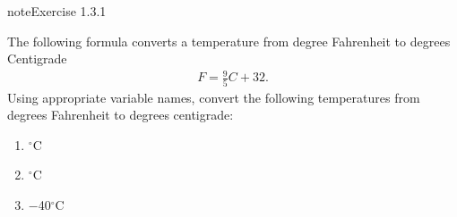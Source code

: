 \documentclass[letterpaper,10pt,english]{jupyterBook}
\begin{document}
\begin{sphinxadmonition}{note}{Exercise 1.3.1}



\sphinxAtStartPar
The following formula converts a temperature from degree Fahrenheit to degrees Centigrade
\begin{equation*}
\begin{split} F = \frac{9}{5}C + 32.\end{split}
\end{equation*}
\sphinxAtStartPar
Using appropriate variable names, convert the following temperatures from degrees Fahrenheit to degrees centigrade:
\begin{enumerate}
%
\item {} 
\(^\circ\)C

\item {} 
\(^\circ\)C

\item {} 
\sphinxAtStartPar
\(-\)40\(^\circ\)C

\end{enumerate}
\end{sphinxadmonition}







\renewcommand{\indexname}{Index}
\printindex
\end{document}
